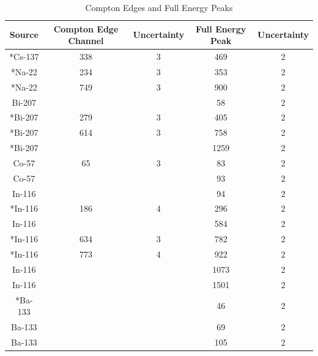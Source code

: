 \documentclass{article}
\begin{document}
\begin{table}[]
\centering
\caption{Compton Edges and Full Energy Peaks}
\label{table}
\begin{tabular}{|c|c|c|c|c|}
\hline
Source & Compton Edge Channel & Uncertainty & Full Energy Peak & Uncertainty \\ \hline
*Cs-137 & 338                  & 3           & 469              & 2           \\ \hline
*Na-22  & 234                  & 3           & 353              & 2           \\ 
*Na-22  & 749                  & 3           & 900              & 2           \\ \hline
Bi-207 &                      &             & 58               & 2           \\ 
*Bi-207 & 279                  & 3           & 405              & 2           \\ 
*Bi-207 & 614                  & 3           & 758              & 2           \\ 
*Bi-207 &                      &             & 1259             & 2           \\ \hline
Co-57  & 65                   & 3           & 83               & 2           \\
Co-57  &                      &             & 93               & 2           \\ \hline
In-116 &                      &             & 94               & 2           \\
*In-116 & 186                  & 4           & 296              & 2           \\ 
In-116 &                      &             & 584              & 2           \\ 
*In-116 & 634                  & 3           & 782              & 2           \\ 
*In-116 & 773                  & 4           & 922              & 2           \\ 
In-116 &                      &             & 1073             & 2           \\ 
In-116 &                      &             & 1501             & 2           \\ \hline
*Ba-133 &                      &             & 46               & 2           \\ 
Ba-133 &                      &             & 69               & 2           \\ 
Ba-133 &                      &             & 105              & 2           \\

\end{tabular}
\end{table}
\end{document}
